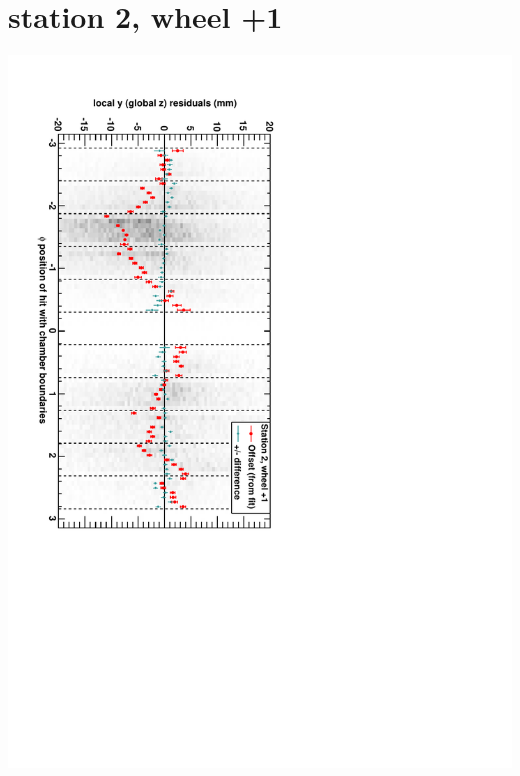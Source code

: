 \documentclass[compress]{beamer}
\begin{document}
\section*{station 2, wheel +1}
\begin{frame} \vfill \mbox{\hspace{-1 cm}\includegraphics[height=1.2\linewidth, angle=90]{DTzVsPhi_st2_whD.pdf}} \end{frame}
\end{document}

